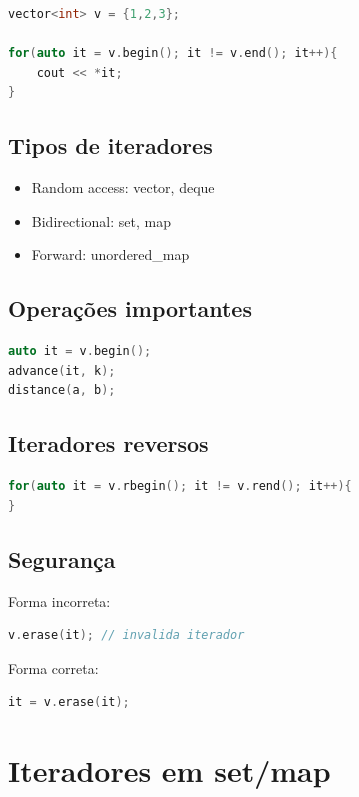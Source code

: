 \documentclass[11pt]{article}
\begin{document}
\begin{lstlisting}[language=C++]
vector<int> v = {1,2,3};

for(auto it = v.begin(); it != v.end(); it++){
    cout << *it;
}
\end{lstlisting}

\subsection{Tipos de iteradores}

\begin{itemize}
    \item Random access: vector, deque
    \item Bidirectional: set, map
    \item Forward: unordered\_map
\end{itemize}

\subsection{Operações importantes}

\begin{lstlisting}[language=C++]
auto it = v.begin();
advance(it, k);
distance(a, b);
\end{lstlisting}

\subsection{Iteradores reversos}

\begin{lstlisting}[language=C++]
for(auto it = v.rbegin(); it != v.rend(); it++){
}
\end{lstlisting}

\subsection{Segurança}

Forma incorreta:
\begin{lstlisting}[language=C++]
v.erase(it); // invalida iterador
\end{lstlisting}

Forma correta:
\begin{lstlisting}[language=C++]
it = v.erase(it);
\end{lstlisting}

\section{Iteradores em set/map}
\end{document}
